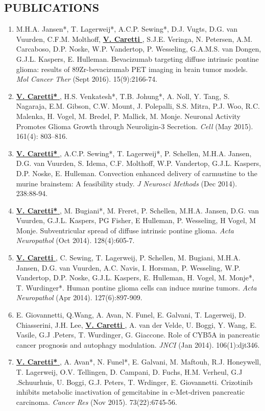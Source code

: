 \documentclass[line,margin]{res}
\newcommand{\namestyle}[1]{\underline{\bf #1 }}
\begin{document}
\begin{resume}
\section{PUBLICATIONS}
\vspace{-0.75pt}
{\footnotesize
\begin{enumerate}
\item M.H.A. Jansen*, T. Lagerweij*, A.C.P. Sewing*, D.J. Vugts, D.G. van Vuurden, C.F.M. Molthoff, \namestyle{V. Caretti}, S.J.E. Veringa, N. Petersen, A.M. Carcaboso, D.P. Noske, W.P. Vandertop, P. Wesseling, G.A.M.S. van Dongen, G.J.L. Kaspers, E. Hulleman. Bevacizumab targeting diffuse intrinsic pontine glioma: results of 89Zr-bevacizumab PET imaging in brain tumor models. \emph{Mol Cancer Ther} (Sept 2016). 15(9):2166-74.
\item \namestyle{V. Caretti*}, H.S. Venkatesh*, T.B. Johung*, A. Noll, Y. Tang, S. Nagaraja, E.M. Gibson, C.W. Mount, J. Polepalli, S.S. Mitra, P.J. Woo, R.C. Malenka, H. Vogel, M. Bredel, P. Mallick, M. Monje. Neuronal Activity Promotes Glioma Growth through Neuroligin-3 Secretion. \emph{Cell} (May 2015). 161(4): 803–816.
\item \namestyle{V. Caretti*}, A.C.P. Sewing*, T. Lagerweij*, P. Schellen, M.H.A. Jansen, D.G. van Vuurden, S. Idema, C.F. Molthoff, W.P. Vandertop, G.J.L. Kaspers, D.P. Noske, E. Hulleman. Convection enhanced delivery of carmustine to the murine brainstem: A feasibility study. \emph{J Neurosci Methods} (Dec 2014). 238:88-94.
\item \namestyle{V. Caretti*}, M. Bugiani*, M. Freret, P. Schellen, M.H.A. Jansen, D.G. van Vuurden, G.J.L. Kaspers, PG Fisher, E Hulleman, P. Wesseling, H Vogel, M Monje. Subventricular spread of diffuse intrinsic pontine glioma. \emph{Acta Neuropathol} (Oct 2014). 128(4):605-7.
\item \namestyle{V. Caretti}, C. Sewing, T. Lagerweij, P. Schellen, M. Bugiani, M.H.A. Jansen, D.G. van Vuurden, A.C. Navis, I. Horsman, P. Wesseling, W.P. Vandertop, D.P. Noske, G.J.L. Kaspers, E. Hulleman, H. Vogel, M. Monje*, T. Wurdinger*. Human pontine glioma cells can induce murine tumors. \emph{Acta Neuropathol} (Apr 2014). 127(6):897-909.
\item E. Giovannetti, Q.Wang, A. Avan, N. Funel, E. Galvani, T. Lagerweij, D. Chiasserini, J.H. Lee, \namestyle{V. Caretti}, A. van der Velde, U. Boggi, Y. Wang, E. Vasile, G.J .Peters, T. Wurdinger, G. Giaccone. Role of CYB5A in pancreatic cancer prognosis and autophagy modulation. \emph{JNCI} (Jan 2014). 106(1):djt346.
\item \namestyle{V. Caretti*}, A. Avan*, N. Funel*, E. Galvani, M. Maftouh, R.J. Honeywell, T. Lagerweij, O.V. Tellingen, D. Campani, D. Fuchs, H.M. Verheul, G.J .Schuurhuis, U. Boggi, G.J. Peters, T. Wrdinger, E. Giovannetti. Crizotinib inhibits metabolic inactivation of gemcitabine in c-Met-driven pancreatic carcinoma. \emph{Cancer Res} (Nov 2015). 73(22):6745-56.

\end{enumerate}}
\end{resume}
\end{document}
